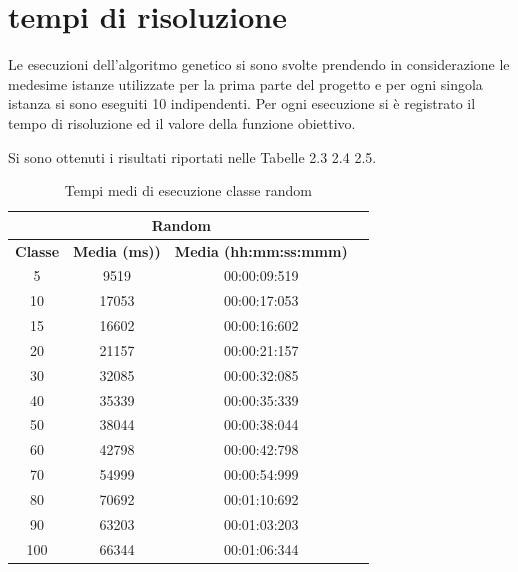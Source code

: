 %
%
\section[Tempi di risoluzione]{tempi di risoluzione}
\label{pt2:time}
Le esecuzioni dell'algoritmo genetico si sono svolte prendendo in considerazione le medesime istanze utilizzate per la prima parte del progetto e per ogni singola istanza si sono eseguiti 10  indipendenti. Per ogni esecuzione si è registrato il tempo di risoluzione ed il valore della funzione obiettivo.

Si sono ottenuti i risultati riportati nelle Tabelle 2.3 2.4 2.5.

\begin{table}[htbp]
\centering
\label{pt1:time:tabular_random}
\begin{tabular}{|c|c|c|c|}
\hline
\multicolumn{3}{|c|}{Random}\\
\hline
\textbf{Classe} & \textbf{Media (ms))} & \textbf{Media (hh:mm:ss:mmm)}\\
\hline
5   &   9519 & 00:00:09:519\\
\hline
10  &  17053 & 00:00:17:053\\
\hline
15  &  16602 & 00:00:16:602\\
\hline
20  &  21157 & 00:00:21:157\\
\hline
30  &  32085 & 00:00:32:085\\
\hline
40  &  35339 & 00:00:35:339\\
\hline
50  &  38044 & 00:00:38:044\\
\hline
60  &  42798 & 00:00:42:798\\
\hline
70  &  54999 & 00:00:54:999\\
\hline
80  &  70692 & 00:01:10:692\\
\hline
90  &  63203 & 00:01:03:203\\
\hline
100 &  66344 & 00:01:06:344\\
\hline
\end{tabular}
\caption{Tempi medi di esecuzione classe random}
\end{table}

